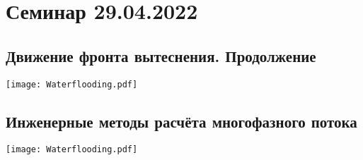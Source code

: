 \documentclass[main.tex]{subfiles}
\begin{document}
\section{Семинар 29.04.2022}

\subsection{Движение фронта вытеснения. Продолжение}

\texttt{[image: Waterflooding.pdf]}






\subsection{Инженерные методы расчёта многофазного потока}

\texttt{[image: Waterflooding.pdf]}









\end{document}
